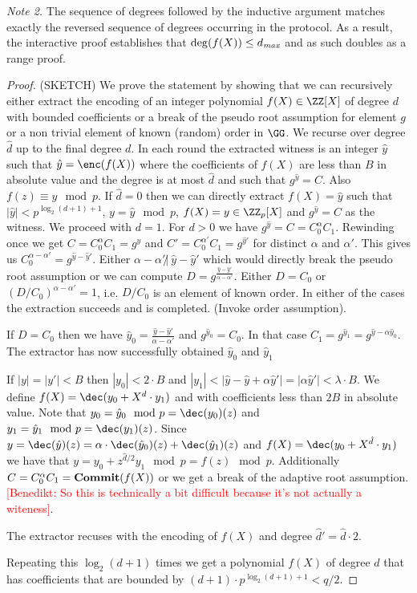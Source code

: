 \documentclass{article}
\theoremstyle{definition}
\newcommand{\benedikt}[1]{{\textcolor{red}{[Benedikt: #1]}}}
\newcommand{\benedikt}[1]{}
\begin{document}
{\it Note 2.} The sequence of degrees followed by the inductive argument matches exactly the reversed sequence of degrees occurring in the protocol. As a result, the interactive proof establishes that $\deg(f(X)) \leq d_{\it max}$ and as such doubles as a range proof.

\begin{proof}
(SKETCH)
We prove the statement by showing that we can recursively either extract the encoding of an integer polynomial $f(X) \in \ZZ[X]$ of degree $d$ with bounded coefficients or a break of the pseudo root assumption for element $g$ or a non trivial element of known (random) order in $\GG$. We recurse over degree $\hat{d}$ up to the final degree $d$.
In each round the extracted witness is an integer $\hat{y}$ such that $\hat{y}=\enc(f(X))$ where the coefficients of $f(X)$ are less than $B$ in absolute value and the degree is at most $\hat{d}$ and such that $g^{\hat{y}}=C$. Also $f(z) \equiv y \mod p$.
If $\hat{d}=0$ then we can directly extract $f(X)=\hat{y}$ such that $\vert \hat{y} \vert < p^{\log_2(d+1)+1}$, $y=\hat{y}\mod p$, $f(X)=y\in \ZZ_p[X]$ and $g^{\hat{y}}=C$ as the witness. We proceed with $d=1$.
For $d>0$ we have $g^{\hat{y}}=C=C_0^{\alpha}C_1$. Rewinding once we get 
 $C=C_0^{\alpha}C_1=g^{\hat{y}}$ and $C'=C_0^{\alpha'}C_1=g^{\hat{y}'}$ for distinct $\alpha$ and $\alpha'$. 
 This gives us $C_0^{\alpha-\alpha'}=g^{\hat{y}-\hat{y}'}$. 
 Either $\alpha-\alpha' \not|~ \hat{y}-\hat{y}' $ which would directly break the pseudo root assumption or we can compute $D=g^{\frac{\hat{y}-\hat{y}'}{\alpha-\alpha'}}$. Either $D=C_0$ or $(D/C_0)^{\alpha-\alpha'}=1$, i.e. $D/C_0$ is an element of known order. In either of the cases the extraction succeeds and is completed. (Invoke order assumption).
 
 If $D=C_0$ then we have $\hat{y}_0=\frac{\hat{y}-\hat{y}'}{\alpha-\alpha'}$ and
 $g^{\hat{y}_0}=C_0$. In that case $C_1=g^{\hat{y}_1}=g^{\hat{y}-\alpha\hat{y}_0}$. The extractor has now successfully obtained $\hat{y}_0$ and $\hat{y}_1$
 
 If $|y|=|y'|<B$ then $|y_0|<  2 \cdot B$ and $|y_1|<|\hat{y}-\hat{y}+\alpha\hat{y}'|=|\alpha \hat{y}'|<\lambda \cdot B$. 
 We define $f(X)=\dec(y_0+X^{d} \cdot y_1)$ and with coefficients less than $2B$ in absolute value. 
 Note that $y_0=\hat{y}_0 \mod p=\dec(y_0)(z)$ and $y_1=\hat{y}_1 \mod p=\dec(y_1)(z)$. Since $y=\dec(\hat{y})(z)=\alpha \cdot \dec(\hat{y}_0)(z)+\dec(\hat{y}_1)(z)$ and $f(X)=\dec(y_0+X^{\hat{d}} \cdot y_1)$ we have that $y=y_0 +z^{\hat{d}/2}y_1 \mod p=f(z) \mod p$.
 Additionally $C=C_0^{\alpha}C_1=\textbf{{Commit}}(f(X))$ or we get a break of the adaptive root assumption.\benedikt{So this is technically a bit difficult because it's not actually a witeness}.
 
 The extractor recuses with the encoding of $f(X)$ and degree $\hat{d}'=\hat{d}\cdot 2$.
 
 Repeating this $\log_2(d+1)$ times we get a polynomial $f(X)$ of degree $d$ that has coefficients that are bounded by $(d+1) \cdot p^{\log_2(d+1)+1} <q/2$. 

\end{proof}
\end{document}
